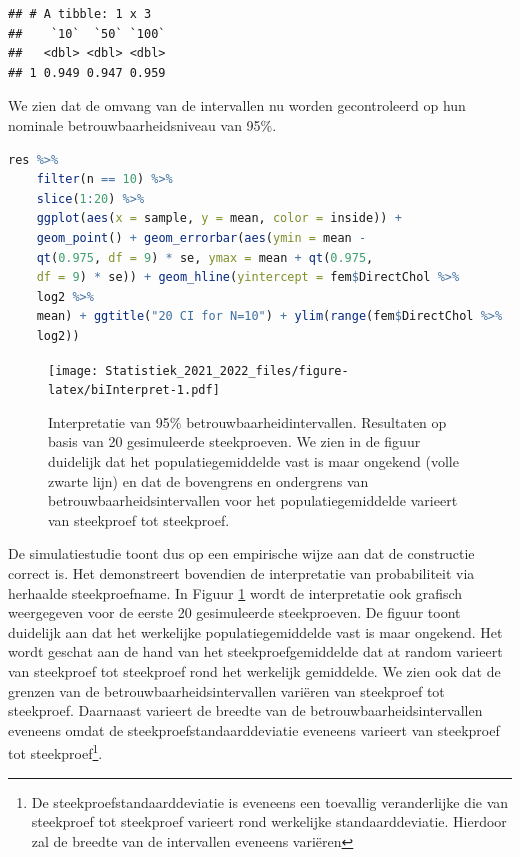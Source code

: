 \documentclass[
  12pt,dutch,coursenotes]{book}
\theoremstyle{definition}
\theoremstyle{definition}
\theoremstyle{definition}
\theoremstyle{definition}
\theoremstyle{remark}
\begin{document}
\begin{lstlisting}
## # A tibble: 1 x 3
##    `10`  `50` `100`
##   <dbl> <dbl> <dbl>
## 1 0.949 0.947 0.959
\end{lstlisting}

We zien dat de omvang van de intervallen nu worden gecontroleerd op hun nominale betrouwbaarheidsniveau van 95\%.

\begin{lstlisting}[language=R]
res %>%
    filter(n == 10) %>%
    slice(1:20) %>%
    ggplot(aes(x = sample, y = mean, color = inside)) +
    geom_point() + geom_errorbar(aes(ymin = mean -
    qt(0.975, df = 9) * se, ymax = mean + qt(0.975,
    df = 9) * se)) + geom_hline(yintercept = fem$DirectChol %>%
    log2 %>%
    mean) + ggtitle("20 CI for N=10") + ylim(range(fem$DirectChol %>%
    log2))
\end{lstlisting}

\begin{figure}
\centering
\texttt{[image: Statistiek\_2021\_2022\_files/figure-latex/biInterpret-1.pdf]}
\caption{\label{fig:biInterpret}Interpretatie van 95\(\%\) betrouwbaarheidintervallen. Resultaten op basis van 20 gesimuleerde steekproeven. We zien in de figuur duidelijk dat het populatiegemiddelde vast is maar ongekend (volle zwarte lijn) en dat de bovengrens en ondergrens van betrouwbaarheidsintervallen voor het populatiegemiddelde varieert van steekproef tot steekproef.}
\end{figure}

De simulatiestudie toont dus op een empirische wijze aan dat de constructie correct is.
Het demonstreert bovendien de interpretatie van probabiliteit via herhaalde steekproefname.
In Figuur \ref{fig:biInterpret} wordt de interpretatie ook grafisch weergegeven voor de eerste 20 gesimuleerde steekproeven. De figuur toont duidelijk aan dat het werkelijke populatiegemiddelde vast is maar ongekend. Het wordt geschat aan de hand van het steekproefgemiddelde dat at random varieert van steekproef tot steekproef rond het werkelijk gemiddelde.
We zien ook dat de grenzen van de betrouwbaarheidsintervallen variëren van steekproef tot steekproef.
Daarnaast varieert de breedte van de betrouwbaarheidsintervallen eveneens omdat de steekproefstandaarddeviatie eveneens varieert van steekproef tot steekproef\footnote{De steekproefstandaarddeviatie is eveneens een toevallig veranderlijke die van steekproef tot steekproef varieert rond werkelijke standaarddeviatie. Hierdoor zal de breedte van de intervallen eveneens variëren}.
\end{document}
